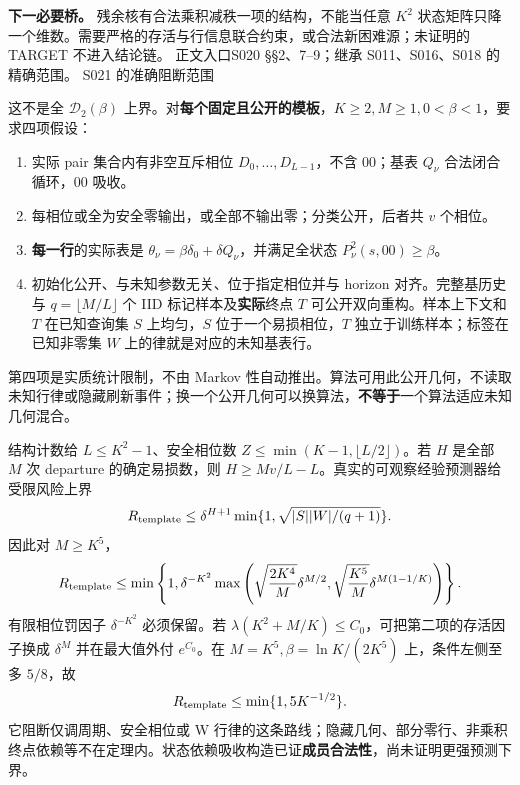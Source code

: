\documentclass[11pt,a4paper]{article}
\newcommand{\head}[2]{{\small\sffamily #1}\par\vspace{2pt}{\LARGE\bfseries #2}\par\vspace{5pt}}
\newcommand{\entry}[1]{\vfill\noindent\small 正文入口\quad #1\normalsize}
\begin{document}
\textbf{下一必要桥。} 残余核有合法乘积减秩一项的结构，不能当任意 $K^2$ 状态矩阵只降一个维数。需要严格的存活与行信息联合约束，或合法新困难源；未证明的 TARGET 不进入结论链。
\entry{S020 §§2、7--9；继承 S011、S016、S018 的精确范围。}
\newpage
\head{S021 的准确阻断范围}{固定公开时钟模板不能只靠加长周期}
这不是全 $\mathcal D_2(\beta)$ 上界。对\textbf{每个固定且公开的模板}，$K\ge2,M\ge1,0<\beta<1$，要求四项假设：
\begin{enumerate}[leftmargin=1.5em,itemsep=3pt,topsep=3pt]
\item 实际 pair 集合内有非空互斥相位 $D_0,\ldots,D_{L-1}$，不含 $00$；基表 $Q_\nu$ 合法闭合循环，$00$ 吸收。
\item 每相位或全为安全零输出，或全部不输出零；分类公开，后者共 $v$ 个相位。
\item \textbf{每一行}的实际表是 $\theta_\nu=\beta\delta_0+\delta Q_\nu$，并满足全状态 $P_\nu^2(s,00)\ge\beta$。
\item 初始化公开、与未知参数无关、位于指定相位并与 horizon 对齐。完整基历史与 $q=\lfloor M/L\rfloor$ 个 IID 标记样本及\textbf{实际}终点 $T$ 可公开双向重构。样本上下文和 $T$ 在已知查询集 $S$ 上均匀，$S$ 位于一个易损相位，$T$ 独立于训练样本；标签在已知非零集 $W$ 上的律就是对应的未知基表行。
\end{enumerate}
第四项是实质统计限制，不由 Markov 性自动推出。算法可用此公开几何，不读取未知行律或隐藏刷新事件；换一个公开几何可以换算法，\textbf{不等于}一个算法适应未知几何混合。

结构计数给 $L\le K^2-1$、安全相位数 $Z\le\min(K-1,\lfloor L/2\rfloor)$。若 $H$ 是全部 $M$ 次 departure 的确定易损数，则 $H\ge Mv/L-L$。真实的可观察经验预测器给受限风险上界
\[
R_{\rm template}\le\delta^{H+1}\min\{1,\sqrt{|S||W|/(q+1)}\}.
\]
因此对 $M\ge K^5$，
\[
R_{\rm template}\le\min\left\{1,\delta^{-K^2}\max\left(
\sqrt{\frac{2K^4}{M}}\delta^{M/2},\sqrt{\frac{K^5}{M}}\delta^{M(1-1/K)}\right)\right\}.
\]
有限相位罚因子 $\delta^{-K^2}$ 必须保留。若 $\lambda(K^2+M/K)\le C_0$，可把第二项的存活因子换成 $\delta^M$ 并在最大值外付 $e^{C_0}$。在 $M=K^5,\beta=\ln K/(2K^5)$ 上，条件左侧至多 $5/8$，故
\[
R_{\rm template}\le\min\{1,5K^{-1/2}\}.
\]
它阻断仅调周期、安全相位或 W 行律的这条路线；隐藏几何、部分零行、非乘积终点依赖等不在定理内。状态依赖吸收构造已证\textbf{成员合法性}，尚未证明更强预测下界。
\end{document}
